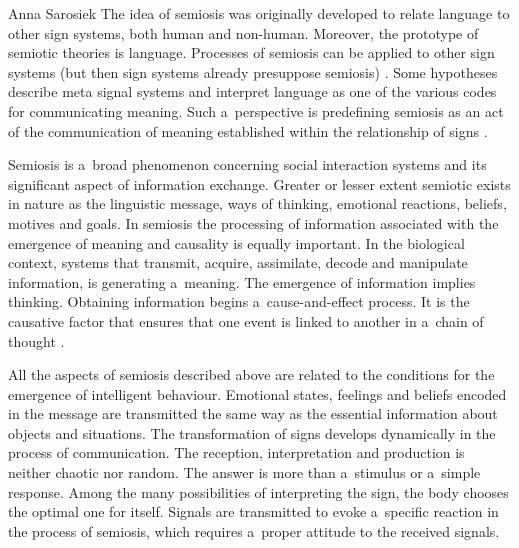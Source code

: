 \begin{artengenv}{Anna Sarosiek}
The idea of semiosis was originally developed to relate language to other sign systems, both human and non-human. Moreover, the prototype of semiotic theories is language. Processes of semiosis can be applied to other sign systems (but then sign systems already presuppose semiosis)
\parencite[][]{noth_semiotic_2002}. %
 Some hypotheses describe meta signal systems and interpret language as one of the various codes for communicating meaning. Such a~perspective is predefining semiosis as an act of the communication of meaning established within the relationship of signs 
\parencites[][]{bateson_information_1966}[][]{pavlov_conditioned_1927}.%


Semiosis is a~broad phenomenon concerning social interaction systems and its significant aspect of information exchange. Greater or lesser extent semiotic exists in nature as the linguistic message, ways of thinking, emotional reactions, beliefs, motives and goals. In semiosis the processing of information associated with the emergence of meaning and causality is equally important. In the biological context, systems that transmit, acquire, assimilate, decode and manipulate information, is generating a~meaning. The emergence of information implies thinking. Obtaining information begins a~cause-and-effect process. It is the causative factor that ensures that one event is linked to another in a~chain of thought
\parencite[][]{pharoah_2020}.%


All the aspects of semiosis described above are related to the conditions for the emergence of intelligent behaviour. Emotional states, feelings and beliefs encoded in the message are transmitted the same way as the essential information about objects and situations. The transformation of signs develops dynamically in the process of communication. The reception, interpretation and production is neither chaotic nor random. The answer is more than a~stimulus or a~simple response. Among the many possibilities of interpreting the sign, the body chooses the optimal one for itself. Signals are transmitted to evoke a~specific reaction in the process of semiosis, which requires a~proper attitude to the received signals.


\end{artengenv}
